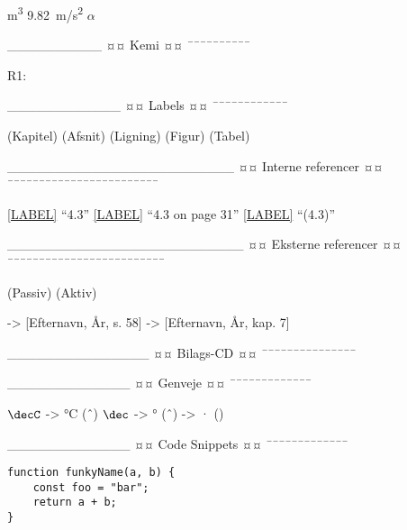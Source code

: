 \si{m^3}
\SI{9,82}{m/s^2}
$\alpha$

__________
¤¤ Kemi ¤¤
¯¯¯¯¯¯¯¯¯¯




R1: 

____________
¤¤ Labels ¤¤
¯¯¯¯¯¯¯¯¯¯¯¯

\label{chap:...}    (Kapitel)
\label{sec:...}     (Afsnit)
\label{eq:...}      (Ligning)
\label{fig:...}     (Figur)
\label{tab:...}     (Tabel)

________________________
¤¤ Interne referencer ¤¤
¯¯¯¯¯¯¯¯¯¯¯¯¯¯¯¯¯¯¯¯¯¯¯¯

\ref{LABEL} 		“4.3”
\vref{LABEL} 		“4.3 on page 31”
\eqref{LABEL} 		“(4.3)”

_________________________
¤¤ Eksterne referencer ¤¤
¯¯¯¯¯¯¯¯¯¯¯¯¯¯¯¯¯¯¯¯¯¯¯¯¯

\citep{LABEL} 		(Passiv)
\citet{LABEL} 		(Aktiv)

\citep[ SIDE, AFSNIT, KAPITEL MV.]{LABEL}

\citep[ s. 58]{fysikbog} 		->		[Efternavn, År, s. 58]
\citep[ kap. 7]{fysikbog} 		->		[Efternavn, År, kap. 7]


_______________
¤¤ Bilags-CD ¤¤
¯¯¯¯¯¯¯¯¯¯¯¯¯¯¯

\citep[ FILNAVN]{cd}


_____________
¤¤ Genveje ¤¤
¯¯¯¯¯¯¯¯¯¯¯¯¯

$\decC$ 		->		°C 		(ˆ{\circ})
$\dec$ 			->		° 		(ˆ{\circ})
\m 				->		· 		(\cdot)

_____________
¤¤ Code Snippets ¤¤
¯¯¯¯¯¯¯¯¯¯¯¯¯
\begin{lstlisting}[language=ProgrammingLanguageName, caption={FIGURTEKST FX: \texttt{funkyName(a, b)}}, captionpos=b, label={snip:LABELNAVN}]
function funkyName(a, b) {
    const foo = "bar";
    return a + b;
}
\end{lstlisting}

